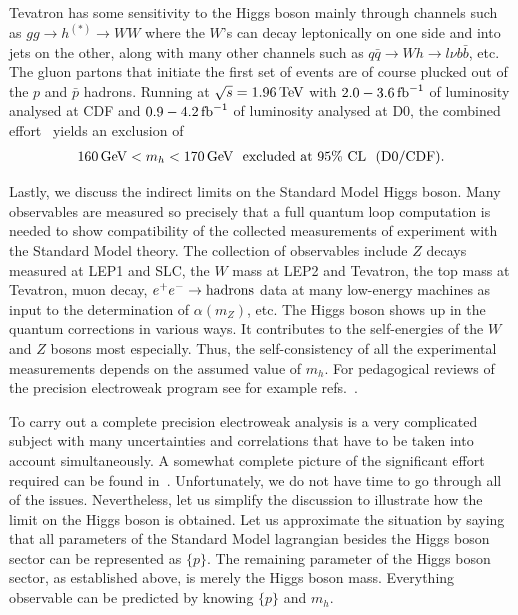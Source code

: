 \documentclass[12pt]{article}
\def\beq{\begin{eqnarray}}
\def\eeq{\end{eqnarray}}
\def\tev{\, {\rm TeV}}
\def\gev{\, {\rm GeV}}
\def\xfb{\, {\rm fb}}
\begin{document}
Tevatron has some sensitivity to the Higgs boson mainly through channels such as $gg\to h^{(*)}\to WW$ where the $W$'s can decay leptonically on one side and into jets on the other, along with many other channels such as $q\bar q\to Wh\to l\nu b\bar b$, etc.  The gluon partons that initiate the first set of events are of course plucked out of the $p$ and $\bar p$ hadrons.  Running at $\sqrt{s}=1.96\tev$ with $2.0-3.6\xfb^{-1}$ of luminosity analysed at CDF and $0.9-4.2\xfb^{-1}$ of luminosity analysed at D0, the combined effort~\cite{tevhiggslimit} yields an exclusion of
\beq
160\gev < m_h<170\gev~~{\rm excluded~at}~95\%~{\rm CL~~(D0/CDF)}.
\eeq

Lastly, we discuss the indirect limits on the Standard Model Higgs boson. Many observables are measured so precisely that  a full quantum loop computation is needed to show compatibility of the collected measurements of experiment with the Standard Model theory. The collection of observables include $Z$ decays measured at LEP1 and SLC, the $W$ mass at LEP2 and Tevatron, the top mass at Tevatron, muon decay, $e^+e^-\to {\rm hadrons}$ data at many low-energy machines as input to the determination of $\alpha(m_Z)$, etc.  The Higgs boson shows up in the quantum corrections in various ways. It contributes to the self-energies of the $W$ and $Z$ bosons most especially. Thus, the self-consistency of all the experimental measurements depends on the assumed value of $m_h$.  For pedagogical reviews of the precision electroweak program see for example refs.~\cite{Kennedy:1992tj,Wells:2005vk}.

To carry out a complete precision electroweak analysis is a very complicated subject with many uncertainties and correlations that have to be taken into account simultaneously. A somewhat complete picture of the significant effort required can be found in~\cite{:2005ema,Alcaraz:2006mx,Flacher:2008zq}.  Unfortunately, we do not have time to go through all of the issues. Nevertheless, let us simplify the discussion to illustrate how the limit on the Higgs boson is obtained. Let us approximate the situation by saying that all parameters of the Standard Model lagrangian besides the Higgs boson sector can be represented as $\{p\}$.  The remaining parameter of the Higgs boson sector, as established above, is merely the Higgs boson mass. Everything observable can be predicted by knowing $\{p\}$ and $m_h$.  
\end{document}
